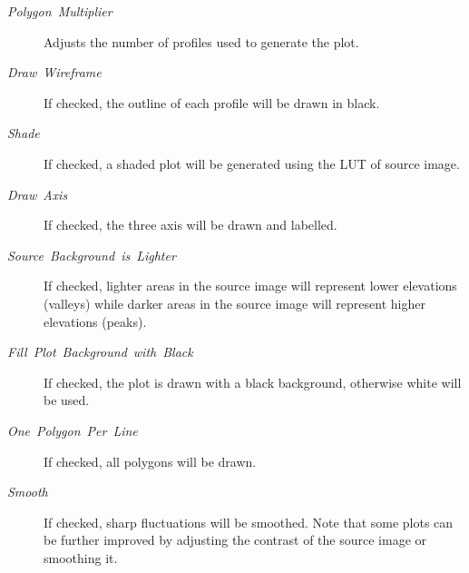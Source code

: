\begin{description}
\item [{\emph{Polygon\ Multiplier}}] Adjusts the number of profiles used
to generate the plot. 
\item [{\emph{Draw}\ \emph{Wireframe}}] If checked, the outline of each
profile will be drawn in black. 
\item [{\emph{Shade}}] If checked, a shaded plot will be generated using
the LUT of source image.
\item [{\emph{Draw}\ \emph{Axis}}] If checked, the three axis will be
drawn and labelled. 
\item [{\emph{Source}\ \emph{Background}\ \emph{is}\ \emph{Lighter}}] If
checked, lighter areas in the source image will represent lower elevations
(valleys) while darker areas in the source image will represent higher
elevations (peaks). 
\item [{\emph{Fill}\ \emph{Plot}\ \emph{Background}\ \emph{with}\ \emph{Black}}] If
checked, the plot is drawn with a black background, otherwise white
will be used.
\item [{\emph{One}\ \emph{Polygon}\ \emph{Per}\ \emph{Line}}] If checked,
all polygons will be drawn.
\item [{\emph{Smooth}}] If checked, sharp fluctuations will be smoothed.
Note that some plots can be further improved by adjusting the contrast
of the source image or smoothing it. 
\end{description}


